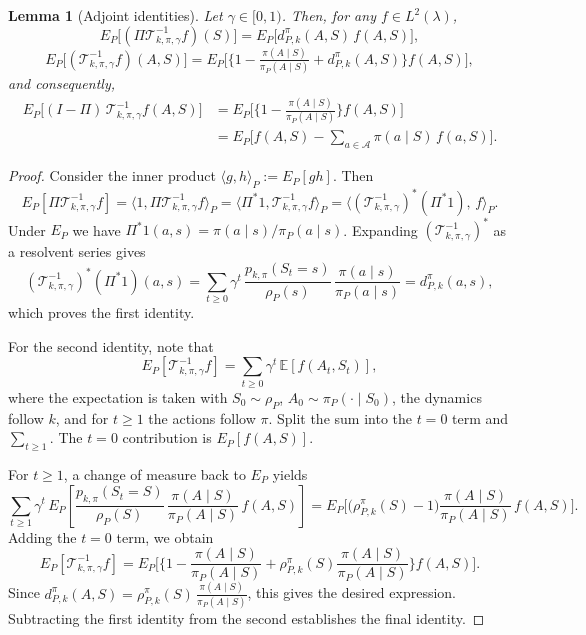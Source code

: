 \documentclass[11pt]{article}
\theoremstyle{plain}
\newtheorem{lemma}[theorem]{Lemma}
\begin{document}
\begin{lemma}[Adjoint identities]
\label{lemma::adjointident}
Let $\gamma \in [0,1)$. Then, for any $f \in L^2(\lambda)$,
\[
E_P\!\big[(\Pi \mathcal{T}_{k,\pi,\gamma}^{-1} f)(S)\big] 
= E_P\!\big[d_{P,k}^{\pi}(A,S)\,f(A,S)\big],
\]
\[
E_P\!\big[(\mathcal{T}_{k,\pi,\gamma}^{-1} f)(A,S)\big] 
= E_P\!\Big[\Big\{1 - \tfrac{\pi(A \mid S)}{\pi_P(A \mid S)} 
+ d_{P,k}^{\pi}(A,S)\Big\} f(A,S)\Big],
\]
and consequently,
\begin{align*}
   E_P\!\big[(I - \Pi)\,\mathcal{T}_{k,\pi,\gamma}^{-1} f(A,S)\big] 
   &= E_P\!\Big[\Big\{1 - \tfrac{\pi(A \mid S)}{\pi_P(A \mid S)}\Big\} f(A,S)\Big] \\
   &= E_P\!\Big[f(A,S) - \sum_{a \in \mathcal{A}} \pi(a \mid S)\,f(a,S)\Big].
\end{align*}
\end{lemma}

\begin{proof}
Consider the inner product $\langle g,h\rangle_{P} := E_P[gh]$. Then
\[
E_P[\Pi \mathcal{T}_{k,\pi,\gamma}^{-1}f]
= \langle 1, \Pi \mathcal{T}_{k,\pi,\gamma}^{-1}f\rangle_{P}
= \langle \Pi^*1, \mathcal{T}_{k,\pi,\gamma}^{-1}f\rangle_{P}
= \big\langle (\mathcal{T}_{k,\pi,\gamma}^{-1})^*(\Pi^*1),\,f\big\rangle_{P}.
\]
Under $E_P$ we have $\Pi^*1(a,s) = \pi(a\mid s)/\pi_P(a\mid s)$. Expanding $(\mathcal{T}_{k,\pi,\gamma}^{-1})^*$ as a resolvent series gives
\[
(\mathcal{T}_{k,\pi,\gamma}^{-1})^*(\Pi^*1)(a,s)
= \sum_{t\ge0} \gamma^t \,\frac{p_{k,\pi}(S_t=s)}{\rho_P(s)}\,
   \frac{\pi(a\mid s)}{\pi_P(a\mid s)}
= d_{P,k}^{\pi}(a,s),
\]
which proves the first identity.

For the second identity, note that
\[
E_P[\mathcal{T}_{k,\pi,\gamma}^{-1}f]
= \sum_{t\ge0} \gamma^t\,\mathbb{E}[f(A_t,S_t)],
\]
where the expectation is taken with $S_0\sim\rho_P$, $A_0\sim\pi_P(\cdot\mid S_0)$, the dynamics follow $k$, and for $t\ge1$ the actions follow $\pi$. Split the sum into the $t=0$ term and $\sum_{t\ge1}$. The $t=0$ contribution is $E_P[f(A,S)]$.

For $t\ge1$, a change of measure back to $E_P$ yields
\[
\sum_{t\ge1} \gamma^t \, E_P\!\left[
  \frac{p_{k,\pi}(S_t=S)}{\rho_P(S)} \,
  \frac{\pi(A\mid S)}{\pi_P(A\mid S)} \, f(A,S)
\right]
= E_P\!\Big[ \big(\rho_{P,k}^{\pi}(S)-1\big)
   \frac{\pi(A\mid S)}{\pi_P(A\mid S)}\,f(A,S)\Big].
\]
Adding the $t=0$ term, we obtain
\[
E_P[\mathcal{T}_{k,\pi,\gamma}^{-1}f]
= E_P\!\Big[\Big\{1 - \frac{\pi(A\mid S)}{\pi_P(A\mid S)}
   + \rho_{P,k}^{\pi}(S)\frac{\pi(A\mid S)}{\pi_P(A\mid S)}\Big\}
   f(A,S)\Big].
\]
Since $d_{P,k}^{\pi}(A,S) = \rho_{P,k}^{\pi}(S)\,\frac{\pi(A\mid S)}{\pi_P(A\mid S)}$, this gives the desired expression.  
Subtracting the first identity from the second establishes the final identity.
\end{proof}
\end{document}
